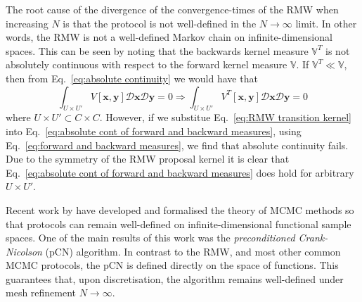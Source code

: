 The root cause of the divergence of the convergence-times of the RMW when increasing $N$ is that the protocol is not well-defined in the $N \to \infty$ limit. In other words, the RMW is not a well-defined Markov chain on infinite-dimensional spaces. This can be seen by noting that the backwards kernel measure $\mathbb{V}^T$ is not absolutely continuous with respect to the forward kernel measure $\mathbb{V}$. If $\mathbb{V}^T \ll \mathbb{V}$, then from Eq.~\ref{eq:absolute continuity} we would have that
\begin{equation} \label{eq:absolute cont of forward and backward measures}
	\int_{U \times U'} V[\mathbf{x}, \mathbf{y}] \mathcal{D}\mathbf{x} \mathcal{D}\mathbf{y} = 0 \Rightarrow  \int_{U \times U'} V^T[\mathbf{x}, \mathbf{y}] \mathcal{D}\mathbf{x} \mathcal{D}\mathbf{y} = 0
\end{equation}
where $U \times U' \subset C \times C$. However, if we substitue Eq.~\ref{eq:RMW transition kernel} into Eq.~\ref{eq:absolute cont of forward and backward measures}, using Eq.~\ref{eq:forward and backward measures}, we find that absolute continuity fails. Due to the symmetry of the RMW proposal kernel it is clear that Eq.~\ref{eq:absolute cont of forward and backward measures} does hold for arbitrary $U \times U'$.

Recent work by \citep{beskosMCMCMETHODSDIFFUSION2008a, cotterMCMCMethodsFunctions2013a, hairerAnalysisSPDEsArising2005a, hairerAnalysisSPDEsArising2007a} have developed and formalised the theory of MCMC methods so that protocols can remain well-defined on infinite-dimensional functional sample spaces. One of the main results of this work was the \textit{preconditioned Crank-Nicolson} (pCN) algorithm. In contrast to the RMW, and most other common MCMC protocols, the pCN is defined directly on the space of functions. This guarantees that, upon discretisation, the algorithm remains well-defined under mesh refinement $N \to \infty$.

